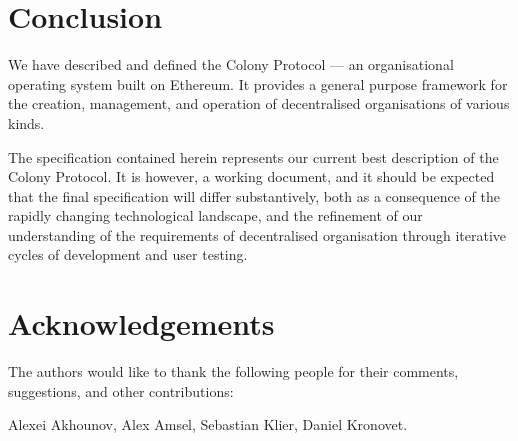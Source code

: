 \section{Conclusion}\label{sec:conclusion}

We have described and defined the Colony Protocol --- an organisational operating system built on Ethereum. It provides a general purpose framework for the creation, management, and operation of decentralised organisations of various kinds.

The specification contained herein represents our current best description of the Colony Protocol. It is however, a working document, and it should be expected that the final specification will differ substantively, both as a consequence of the rapidly changing technological landscape, and the refinement of our understanding of the requirements of decentralised organisation through iterative cycles of development and user testing.

\section{Acknowledgements}\label{sec:acknowledgements}
The authors would like to thank the following people for their comments, suggestions, and other contributions:

Alexei Akhounov, Alex Amsel, Sebastian Klier, Daniel Kronovet.
